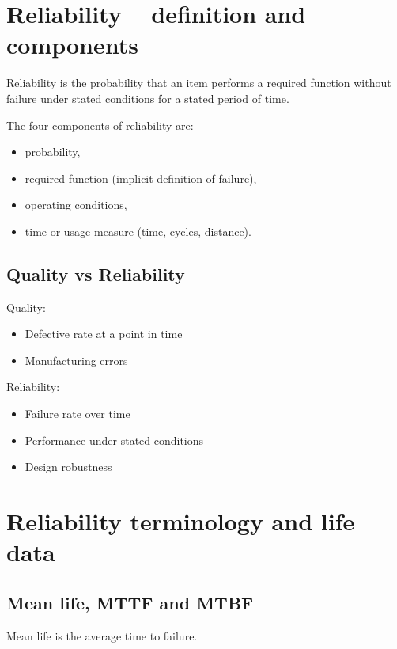 \documentclass[10pt,a4paper,twocolumn]{article}
\begin{document}
\small

\section*{Reliability – definition and components}

Reliability is the probability that an item performs a required function
without failure under stated conditions for a stated period of time.

The four components of reliability are:
\begin{itemize}[leftmargin=*,itemsep=0pt]
\item probability,
\item required function (implicit definition of failure),
\item operating conditions,
\item time or usage measure (time, cycles, distance).
\end{itemize}

\subsection*{Quality vs Reliability}

Quality:
\begin{itemize}
\item Defective rate at a point in time
\item Manufacturing errors
\end{itemize}

Reliability:
\begin{itemize}
\item Failure rate over time
\item Performance under stated conditions
\item Design robustness
\end{itemize}


\section*{Reliability terminology and life data}

\subsection*{Mean life, MTTF and MTBF}

Mean life is the average time to failure.
\end{document}
